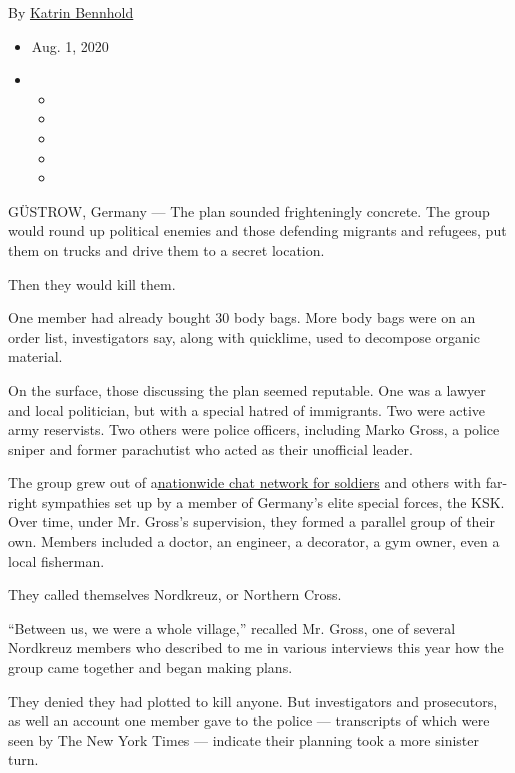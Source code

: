 By \href{https://www.nytimes.com/by/katrin-bennhold}{Katrin Bennhold}

\begin{itemize}
\item
  Aug. 1, 2020
\item
  \begin{itemize}
  \item
  \item
  \item
  \item
  \item
  \end{itemize}
\end{itemize}

GÜSTROW, Germany --- The plan sounded frighteningly concrete. The group
would round up political enemies and those defending migrants and
refugees, put them on trucks and drive them to a secret location.

Then they would kill them.

One member had already bought 30 body bags. More body bags were on an
order list, investigators say, along with quicklime, used to decompose
organic material.

On the surface, those discussing the plan seemed reputable. One was a
lawyer and local politician, but with a special hatred of immigrants.
Two were active army reservists. Two others were police officers,
including Marko Gross, a police sniper and former parachutist who acted
as their unofficial leader.

The group grew out of
a\href{https://www.nytimes.com/2020/07/03/world/europe/germany-military-neo-nazis-ksk.html?searchResultPosition=2}{nationwide
chat network for soldiers} and others with far-right sympathies set up
by a member of Germany's elite special forces, the KSK. Over time, under
Mr. Gross's supervision, they formed a parallel group of their own.
Members included a doctor, an engineer, a decorator, a gym owner, even a
local fisherman.

They called themselves Nordkreuz, or Northern Cross.

``Between us, we were a whole village,'' recalled Mr. Gross, one of
several Nordkreuz members who described to me in various interviews this
year how the group came together and began making plans.

They denied they had plotted to kill anyone. But investigators and
prosecutors, as well an account one member gave to the police ---
transcripts of which were seen by The New York Times --- indicate their
planning took a more sinister turn.

